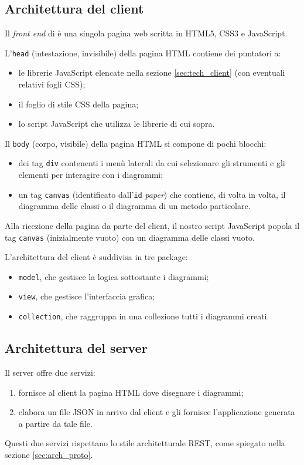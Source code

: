 \subsection{Architettura del client} \label{sec:arch_client}
Il \emph{front end} di \proj{} è una singola pagina web scritta in HTML5, CSS3 e JavaScript.

L'\texttt{head} (intestazione, invisibile) della pagina HTML contiene dei puntatori a:
\begin{itemize}
	\item le librerie JavaScript elencate nella sezione \ref{sec:tech_client} (con eventuali relativi fogli CSS);
	\item il foglio di stile CSS della pagina;
	\item lo script JavaScript che utilizza le librerie di cui sopra.
\end{itemize}

Il \texttt{body} (corpo, visibile) della pagina HTML si compone di pochi blocchi:
\begin{itemize}
	\item dei tag \texttt{div} contenenti i menù laterali da cui selezionare gli strumenti e gli elementi per interagire con i diagrammi;
	\item un tag \texttt{canvas} (identificato dall'\texttt{id} \emph{paper}) che contiene, di volta in volta, il diagramma delle classi o il diagramma di un metodo particolare.
\end{itemize}

Alla ricezione della pagina da parte del client, il nostro script JavaScript popola il tag \texttt{canvas} (inizialmente vuoto) con un diagramma delle classi vuoto.

L'architettura del client è suddivisa in tre package:
\begin{itemize}
	\item \texttt{model}, che gestisce la logica sottostante i diagrammi;
	\item \texttt{view}, che gestisce l'interfaccia grafica;
	\item \texttt{collection}, che raggruppa in una collezione tutti i diagrammi creati.
\end{itemize}




\subsection{Architettura del server} \label{sec:arch_server}
Il server offre due servizi:
\begin{enumerate}
	\item fornisce al client la pagina HTML dove disegnare i diagrammi;
	\item elabora un file JSON in arrivo dal client e gli fornisce l'applicazione generata a partire da tale file.
\end{enumerate}
Questi due servizi rispettano lo stile architetturale REST, come spiegato nella sezione \ref{sec:arch_proto}.

